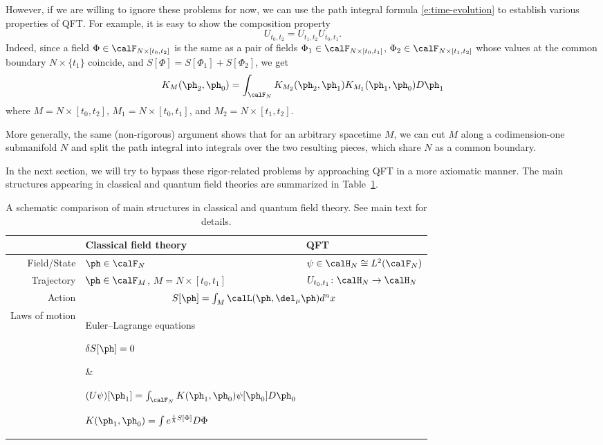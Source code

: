 However, if we are willing to ignore these problems for now, we can
use the path integral formula \eqref{e:time-evolution} to establish various
properties of QFT. For example,
it is easy to show the composition property
\begin{equation*}
U_{t_0,t_2}= U_{t_1,t_2} U_{t_0,t_1}.
\end{equation*}
Indeed, since a field $\Phi\in \calF_{N\times [t_0,t_2]}$ is the same as a
pair of fields $\Phi_1\in \calF_{N\times [t_0,t_1]}$,
$\Phi_2\in \calF_{N\times [t_1,t_2]}$ whose values at the common boundary
$N\times\{t_1\}$ coincide, and $S[\Phi]=S[\Phi_1]+S[\Phi_2]$,  we get
\begin{equation}\label{e:gluing}
  K_M(\ph_2,\ph_0) = \int_{\calF_N}
  K_{M_2}( \ph_2,\ph_1) K_{M_1}(\ph_1, \ph_0) D \ph_1
\end{equation}
where $M=N\times [t_0,t_2]$, $M_1=N\times [t_0,t_1]$, and
$M_2=N\times [t_1,t_2]$.


More generally, the same (non-rigorous) argument shows that for an arbitrary
spacetime $M$, we can cut $M$ along a codimension-one submanifold $N$ and split
the path integral into integrals over the two resulting pieces, which share $N$
as a common boundary.



In the next section, we will try to bypass these rigor-related problems by
approaching QFT in a more axiomatic manner. The main structures appearing
in classical and quantum field theories are summarized in
Table~\ref{tab:qft}.

\begin{table}[h]
	\centering
	\begin{tabular}{|r|l|l|}
		\hline
		&\textbf{Classical field theory} & \textbf{QFT} \\[5pt]
		\hline
		Field/State &$\ph \in \calF_N$
		& $\psi \in \calH_N \cong L^2(\calF_N)$ \\[5pt]
		Trajectory
		&$\ph\in \calF_{M}$, $M=N\times[t_0, t_1]$
		&$U_{t_0,t_1}\colon \calH_N\to \calH_N$ \\[5pt]
		Action
		& \multicolumn{2}{c|}{$S[\ph]=\int_M \calL(\ph, \del_\mu\ph) d^{n}x$}
    \\[5pt]
		Laws of motion
		&\parbox[t]{5cm}{Euler--Lagrange equations\par
			\quad $\delta S[\ph]=0$
		}
		& \parbox[t]{6cm}{
			$(U \psi)[\ph_1] = \int_{\calF_N} K(\ph_1,\ph_0) \psi[\ph_0] D \ph_0$\par
      $K(\ph_1,\ph_0) = \int e^{\frac{i}{\hbar} S[\Phi]} D\Phi$
		}\\
		\hline
	\end{tabular}
	\caption{A schematic comparison of main structures in classical
    and quantum field theory. See main text for details.}
	\label{tab:qft}
\end{table}

